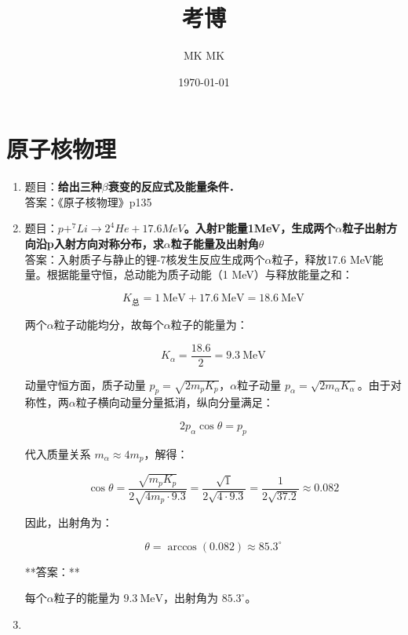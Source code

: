 \documentclass{article}
\title{考博}
\author{MK MK}
\date{\today}
\begin{document}
\maketitle

\section{原子核物理}


\begin{enumerate}
    \item 题目：\textbf{给出三种$\beta$衰变的反应式及能量条件．}\\答案：《原子核物理》p135
\item 题目：\textbf{$p + ^{7}Li \rightarrow 2^{4}He + 17.6 MeV$。入射P能量1MeV，生成两个$\alpha$粒子出射方向沿p入射方向对称分布，求$\alpha$粒子能量及出射角$\theta$}\\
 答案：入射质子与静止的锂-7核发生反应生成两个$\alpha$粒子，释放17.6 MeV能量。根据能量守恒，总动能为质子动能（1 MeV）与释放能量之和：

\[
K_{\text{总}} = 1\ \text{MeV} + 17.6\ \text{MeV} = 18.6\ \text{MeV}
\]

两个$\alpha$粒子动能均分，故每个$\alpha$粒子的能量为：

\[
K_{\alpha} = \frac{18.6}{2} = 9.3\ \text{MeV}
\]

动量守恒方面，质子动量 \(p_p = \sqrt{2m_p K_p}\)，$\alpha$粒子动量 \(p_{\alpha} = \sqrt{2m_{\alpha} K_{\alpha}}\)。由于对称性，两$\alpha$粒子横向动量分量抵消，纵向分量满足：

\[
2p_{\alpha} \cos\theta = p_p
\]

代入质量关系 \(m_{\alpha} \approx 4m_p\)，解得：

\[
\cos\theta = \frac{\sqrt{m_p K_p}}{2\sqrt{4m_p \cdot 9.3}} = \frac{\sqrt{1}}{2\sqrt{4 \cdot 9.3}} = \frac{1}{2\sqrt{37.2}} \approx 0.082
\]

因此，出射角为：

\[
\theta = \arccos(0.082) \approx 85.3^\circ
\]

**答案：**

每个$\alpha$粒子的能量为 \(\boxed{9.3\ \text{MeV}}\)，出射角为 \(\boxed{85.3^\circ}\)。
\item 

\end{enumerate}
\end{document}
